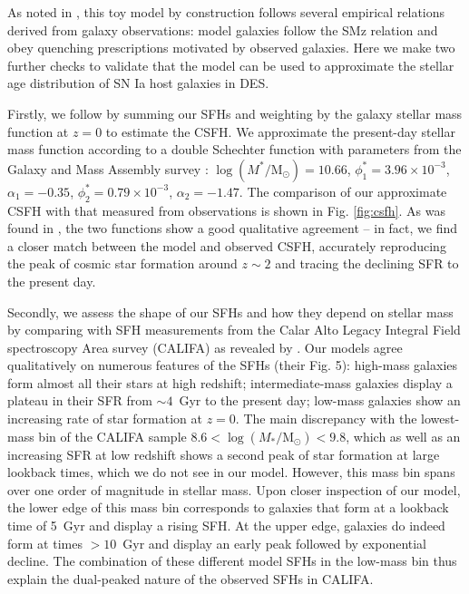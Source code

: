 \documentclass[fleqn,usenatbib]{mnras}
\begin{document}
As noted in , this toy model by construction follows several empirical relations derived from galaxy observations: model galaxies follow the SMz relation and obey quenching prescriptions motivated by observed galaxies. Here we make two further checks to validate that the model can be used to approximate the stellar age distribution of SN Ia host galaxies in DES.

Firstly, we follow  by summing our SFHs and weighting by the galaxy stellar mass function at $z=0$ to estimate the CSFH. We approximate the present-day stellar mass function according to a double Schechter function with parameters from the Galaxy and Mass Assembly survey \citet{Baldry2018}: $\log(M^*/\mathrm{M}_{\odot})=10.66$, $\phi^*_1=3.96\times10^{-3}$, $\alpha_1=-0.35$, $\phi^*_2=0.79\times10^{-3}$, $\alpha_2=-1.47$.
The comparison of our approximate CSFH with that measured from observations \citep{Madau2014} is shown in Fig. \ref{fig:csfh}. As was found in , the two functions show a good qualitative agreement -- in fact, we find a closer match between the model and observed CSFH, accurately reproducing the peak of cosmic star formation around $z\sim2$ and tracing the declining SFR to the present day.

Secondly, we assess the shape of our SFHs and how they depend on stellar mass by comparing with SFH measurements from the Calar Alto Legacy Integral Field spectroscopy Area survey (CALIFA) as revealed by \citet{GonzalezDelgado2017}. Our models agree qualitatively on numerous features of the SFHs (their Fig. 5): high-mass galaxies form almost all their stars at high redshift; intermediate-mass galaxies display a plateau in their SFR from $\sim4$~Gyr to the present day; low-mass galaxies show an increasing rate of star formation at $z=0$. The main discrepancy with the lowest-mass bin of the CALIFA sample $8.6 <\log (M_*/\mathrm{M}_{\odot})<9.8$, which as well as an increasing SFR at low redshift shows a second peak of star formation at large lookback times, which we do not see in our model. However, this mass bin spans over one order of magnitude in stellar mass. Upon closer inspection of our model, the lower edge of this mass bin corresponds to galaxies that form at a lookback time of 5~Gyr and display a rising SFH. At the upper edge, galaxies do indeed form at times $>10$~Gyr and display an early peak followed by exponential decline. The combination of these different model SFHs in the low-mass bin thus explain the dual-peaked nature of the observed SFHs in CALIFA.
\end{document}

